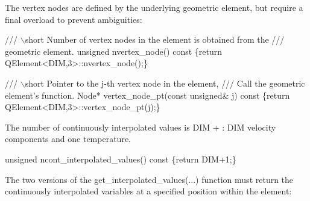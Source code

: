 The vertex nodes are defined by the underlying geometric element, but require a final overload to prevent ambiguities\+:

 
\begin{DoxyCodeInclude}
 \textcolor{comment}{/// \(\backslash\)short Number of vertex nodes in the element is obtained from the}
\textcolor{comment}{ /// geometric element.}
\textcolor{comment}{} \textcolor{keywordtype}{unsigned} nvertex\_node()\textcolor{keyword}{ const}
\textcolor{keyword}{  }\{\textcolor{keywordflow}{return} QElement<DIM,3>::nvertex\_node();\}

\end{DoxyCodeInclude}


 
\begin{DoxyCodeInclude}
 \textcolor{comment}{/// \(\backslash\)short Pointer to the j-th vertex node in the element,}
\textcolor{comment}{ /// Call the geometric element's function.}
\textcolor{comment}{} Node* vertex\_node\_pt(\textcolor{keyword}{const} \textcolor{keywordtype}{unsigned}& j)\textcolor{keyword}{ const}
\textcolor{keyword}{  }\{\textcolor{keywordflow}{return} QElement<DIM,3>::vertex\_node\_pt(j);\}

\end{DoxyCodeInclude}


The number of continuously interpolated values is {\ttfamily D\+IM} {\ttfamily +} {}\+: {\ttfamily D\+IM} velocity components and one temperature.  
\begin{DoxyCodeInclude}
 \textcolor{keywordtype}{unsigned} ncont\_interpolated\_values() const 
  \{\textcolor{keywordflow}{return} DIM+1;\}

\end{DoxyCodeInclude}


The two versions of the {\ttfamily get\+\_\+interpolated\+\_\+values}(...) function must return the continuously interpolated variables at a specified position within the element\+:

